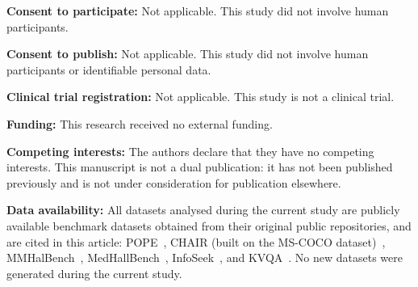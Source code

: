\documentclass[pdflatex,sn-mathphys-num]{sn-jnl}%
\theoremstyle{thmstyleone}%
\theoremstyle{thmstyletwo}%
\theoremstyle{thmstylethree}%
\begin{document}
\textbf{Consent to participate:} Not applicable. This study did not involve human participants.

\textbf{Consent to publish:} Not applicable. This study did not involve human participants or identifiable personal data.

\textbf{Clinical trial registration:} Not applicable. This study is not a clinical trial.

\textbf{Funding:} This research received no external funding.

\textbf{Competing interests:} The authors declare that they have no competing interests. This manuscript is not a dual publication: it has not been published previously and is not under consideration for publication elsewhere.

\textbf{Data availability:} All datasets analysed during the current study are publicly available benchmark datasets obtained from their original public repositories, and are cited in this article: POPE~\cite{li2023pope}, CHAIR (built on the MS-COCO dataset)~\cite{rohrbach2018object}, MMHalBench~\cite{sun2024mmhal}, MedHallBench~\cite{zuo2024medhallbench}, InfoSeek~\cite{chen2024extracting}, and KVQA~\cite{shah2019kvqa}. No new datasets were generated during the current study.

\backmatter









\end{document}
